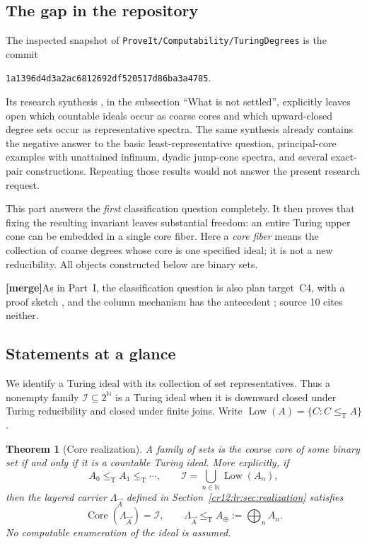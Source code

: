 \documentclass[11pt,letterpaper]{article}
\theoremstyle{plain}
\newtheorem{theorem}{Theorem}[section]
\theoremstyle{definition}
\theoremstyle{remark}
\numberwithin{equation}{section}
\newcommand{\N}{\mathbb N}
\newcommand{\Cantor}{2^{\N}}
\newcommand{\leT}{\leq_{\mathrm T}}
\newcommand{\Core}{\operatorname{Core}}
\newcommand{\Low}{\operatorname{Low}}
\newcommand{\I}{\mathcal I}
\newcommand{\mergenote}[1]{\par\smallskip\noindent
 {\small\textsf{\textbf{[merge]}}\enspace #1}\par\smallskip}
\newcommand{\Aplus}{A_{\oplus}}          %
\newcommand{\Lam}{\Lambda_{\vec A}}      %
\begin{document}
\subsection{The gap in the repository}
The inspected snapshot of \texttt{ProveIt/Computability/TuringDegrees} is the commit
\begin{center}\small\texttt{1a1396d4d3a2ac6812692df520517d86ba3a4785}.\end{center}
Its research synthesis \cite{Repo}, in the subsection ``What is not settled'',
explicitly leaves open which countable ideals occur as coarse cores and which
upward-closed degree sets occur as representative spectra. The same synthesis already
contains the negative answer to the basic least-representative question,
principal-core examples with unattained infimum, dyadic jump-cone spectra, and
several exact-pair constructions. Repeating those results would not answer the
present research request.

This part answers the \emph{first} classification question completely. It then proves
that fixing the resulting invariant leaves substantial freedom: an entire Turing upper
cone can be embedded in a single core fiber. Here a \emph{core fiber} means the
collection of coarse degrees whose core is one specified ideal; it is not a new
reducibility. All objects constructed below are binary sets.

\mergenote{As in Part~I, the classification question is also plan target~C4, with a
proof sketch \cite{Plan}, and the column mechanism has the antecedent
\cite[Lemma~3.10 and Theorem~3.11]{HJS}; source 10 cites neither.}

\subsection{Statements at a glance}
We identify a Turing ideal with its collection of set representatives. Thus a nonempty
family $\I\subseteq\Cantor$ is a Turing ideal when it is downward closed under Turing
reducibility and closed under finite joins. Write $\Low(A)=\{C:C\leT A\}$.

\begin{theorem}[Core realization]\label{cr12:lr:thm:mainreal}
A family of sets is the coarse core of some binary set if and only if it is a
countable Turing ideal. More explicitly, if
\[
 A_0\leT A_1\leT\cdots,\qquad
 \I=\bigcup_{n\in\N}\Low(A_n),
\]
then the layered carrier $\Lam$ defined in Section~\ref{cr12:lr:sec:realization}
satisfies
\[
 \Core(\Lam)=\I,\qquad \Lam\leT \Aplus:=\bigoplus_n A_n.
\]
No computable enumeration of the ideal is assumed.
\end{theorem}
\end{document}

